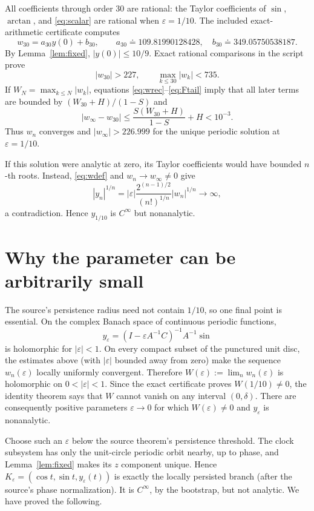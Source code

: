 \documentclass[11pt]{article}
\newcommand{\e}{\varepsilon}
\begin{document}
All coefficients through order 30 are rational: the Taylor coefficients of
$\sin$, $\arctan$, and \eqref{eq:scalar} are rational when $\e=1/10$.
The included exact-arithmetic certificate computes
\begin{equation}\label{eq:finitecert}
 w_{30}=a_{30}y(0)+b_{30},\qquad
 a_{30}\doteq109.81990128428,\quad
 b_{30}\doteq349.05750538187.
\end{equation}
By Lemma~\ref{lem:fixed}, $|y(0)|\le10/9$.  Exact rational comparisons in
the script prove
\begin{equation}\label{eq:separation}
 |w_{30}|>227,\qquad
 \max_{k\le30}|w_k|<735.
\end{equation}
If $W_N=\max_{k\le N}|w_k|$, equations
\eqref{eq:wrec}--\eqref{eq:Ftail} imply that all later terms are bounded by
$(W_{30}+H)/(1-S)$ and
\begin{equation}\label{eq:displacement}
 |w_\infty-w_{30}|\le
 \frac{S(W_{30}+H)}{1-S}+H<10^{-3}.
\end{equation}
Thus $w_n$ converges and $|w_\infty|>226.999$ for the unique periodic
solution at $\e=1/10$.

If this solution were analytic at zero, its Taylor coefficients would have
bounded $n$-th roots.  Instead, \eqref{eq:wdef} and
$w_n\to w_\infty\ne0$ give
\[
 |y_n|^{1/n}
 =|\e|\frac{2^{(n-1)/2}}{(n!)^{1/n}}|w_n|^{1/n}\longrightarrow\infty,
\]
a contradiction.  Hence $y_{1/10}$ is $C^\infty$ but nonanalytic.

\section*{Why the parameter can be arbitrarily small}

The source's persistence radius need not contain $1/10$, so one final point
is essential.  On the complex Banach space of continuous periodic functions,
\[
 y_\e=(I-\e A^{-1}C)^{-1}A^{-1}\sin
\]
is holomorphic for $|\e|<1$.  On every compact subset of the punctured unit
disc, the estimates above (with $|\e|$ bounded away from zero) make the
sequence $w_n(\e)$ locally uniformly convergent.  Therefore
\(
 W(\e):=\lim_n w_n(\e)
\)
is holomorphic on $0<|\e|<1$.  Since the exact certificate proves
$W(1/10)\ne0$, the identity theorem says that $W$ cannot vanish on any
interval $(0,\delta)$.  There are consequently positive parameters
$\e\to0$ for which $W(\e)\ne0$ and $y_\e$ is nonanalytic.

Choose such an $\e$ below the source theorem's persistence threshold.
The clock subsystem has only the unit-circle periodic orbit nearby, up to
phase, and Lemma~\ref{lem:fixed} makes its $z$ component unique.  Hence
$K_\e=(\cos t,\sin t,y_\e(t))$ is exactly the locally persisted branch (after
the source's phase normalization).  It is $C^\infty$, by the bootstrap, but
not analytic.  We have proved the following.
\end{document}
